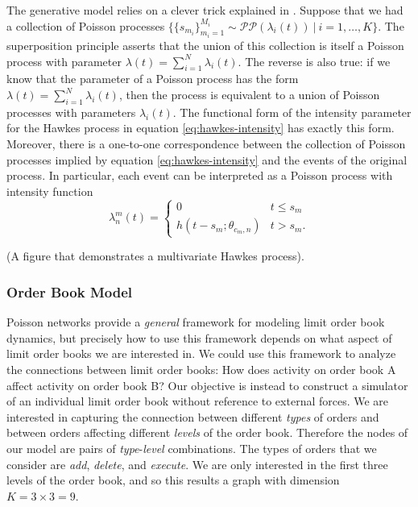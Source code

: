 The generative model relies on a clever trick explained in \cite{Linderman2015}. Suppose that we had a collection of Poisson processes $\{\{s_{m_i}\}_{m_i = 1}^{M_i} \sim \mathcal{PP}(\lambda_i(t)) \ | \ i = 1, \dots, K\}$. The superposition principle asserts that the union of this collection is itself a Poisson process with parameter $\lambda(t) = \sum_{i=1}^{N} \lambda_i(t)$. The reverse is also true: if we know that the parameter of a Poisson process has the form $\lambda(t) = \sum_{i=1}^{N} \lambda_i(t)$, then the process is equivalent to a union of Poisson processes with parameters $\lambda_i(t)$. The functional form of the intensity parameter for the Hawkes process in equation \eqref{eq:hawkes-intensity} has exactly this form. Moreover, there is a one-to-one correspondence between the collection of Poisson processes implied by equation \eqref{eq:hawkes-intensity} and the events of the original process. In particular, each event can be interpreted as a Poisson process with intensity function
\begin{equation}
	\lambda_n^m(t) = \begin{cases}
				          0 & t \le s_m \\
				          h(t - s_m; \theta_{c_m, n}) & t > s_m.
				      \end{cases}
\end{equation}

(A figure that demonstrates a multivariate Hawkes process).


\subsubsection{Order Book Model}
Poisson networks provide a \textit{general} framework for modeling limit order book dynamics, but precisely how to use this framework depends on what aspect of limit order books we are interested in. We could use this framework to analyze the connections between limit order books: How does activity on order book A affect activity on order book B? Our objective is instead to construct a simulator of an individual limit order book without reference to external forces. We are interested in capturing the connection between different \textit{types} of orders and between orders affecting different \textit{levels} of the order book. Therefore the nodes of our model are pairs of \textit{type}-\textit{level} combinations. The types of orders that we consider are \textit{add}, \textit{delete}, and \textit{execute}. We are only interested in the first three levels of the order book, and so this results a graph with dimension $K = 3 \times 3 = 9$.

